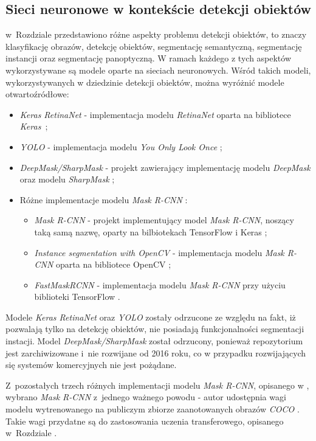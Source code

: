 \subsection{Sieci neuronowe w kontekście detekcji obiektów}

w~Rozdziale  przedstawiono różne aspekty problemu detekcji obiektów, to znaczy klasyfikację obrazów, detekcję obiektów, segmentację semantyczną, segmentację instancji oraz segmentację panoptyczną. W ramach każdego z tych aspektów wykorzystywane są modele oparte na sieciach neuronowych. Wśród takich modeli, wykorzystywanych w dziedzinie detekcji obiektów, można wyróżnić modele otwartoźródłowe:

\begin{itemize}
	\item \textit{Keras RetinaNet} \cite{keras-retinanet-implementation} - implementacja modelu \textit{RetinaNet} \cite{keras-retinanet} oparta na bibliotece \textit{Keras}~\cite{keras};
	\item \textit{YOLO} \cite{yolo-implementation} - implementacja modelu \textit{You Only Look Once} \cite{yolo};
	\item \textit{DeepMask/SharpMask} \cite{deep-sharp-mask} - projekt zawierający implementację modelu \textit{DeepMask} \cite{deepmask} oraz modelu \textit{SharpMask} \cite{sharpmask};
	\item Różne implementacje modelu \textit{Mask R-CNN} \cite{general-mask-rcnn}:
		\begin{itemize}
			\item \textit{Mask R-CNN} \cite{matterport-mask-rcnn} - projekt implementujący model \textit{Mask R-CNN}, noszący taką samą nazwę, oparty na bilbiotekach TensorFlow \cite{tensorflow} i Keras \cite{keras};
			\item \textit{Instance segmentation with OpenCV} \cite{mask-rcnn-opencv} - implementacja modelu \textit{Mask R-CNN} oparta na bibliotece OpenCV \cite{opencv};
			\item \textit{FastMaskRCNN} \cite{fast-mask-rcnn} - implementacja modelu \textit{Mask R-CNN} przy użyciu biblioteki TensorFlow \cite{tensorflow}.
		\end{itemize}
\end{itemize}

Modele \textit{Keras RetinaNet} oraz \textit{YOLO} zostały odrzucone ze względu na fakt, iż pozwalają tylko na detekcję obiektów, nie posiadają funkcjonalności segmentacji instacji.
Model \textit{DeepMask/SharpMask} został odrzucony, ponieważ repozytorium jest zarchiwizowane i~nie rozwijane od 2016 roku, co w przypadku rozwijających się systemów komercyjnych nie jest pożądane.

Z~pozostałych trzech różnych implementacji modelu \textit{Mask R-CNN}, opisanego w \cite{general-mask-rcnn}, wybrano \textit{Mask R-CNN} \cite{matterport-mask-rcnn} z~jednego ważnego powodu - autor udostępnia wagi modelu wytrenowanego na publiczym zbiorze zaanotowanych obrazów \textit{COCO} \cite{coco}. Takie wagi przydatne są do zastosowania uczenia transferowego, opisanego w~Rozdziale .

